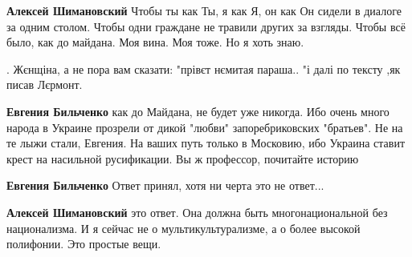 \begin{itemize}
\begin{itemize}
 
\textbf{Алексей Шимановский} Чтобы ты как Ты, я как Я, он как Он сидели в
диалоге за одним столом. Чтобы одни граждане не травили других за взгляды.
Чтобы всё было, как до майдана. Моя вина. Моя тоже. Но я хоть знаю.

 
.
Жєнщіна, а не пора вам сказати: "прівєт нємитая параша.. "і далі по тексту ,як писав Лєрмонт.

 
\textbf{Евгения Бильченко} как до Майдана, не будет уже никогда. Ибо очень
много народа в Украине прозрели от дикой "любви" запоребриковских "братьев". Не
на те лыжи стали, Евгения. На ваших путь только в Московию, ибо Украина ставит
крест на насильной русификации. Вы ж профессор, почитайте историю

 
\textbf{Евгения Бильченко} Ответ принял, хотя ни черта это не ответ...

 
\textbf{Алексей Шимановский} это ответ. Она должна быть многонациональной без
национализма. И я сейчас не о мультикультурализме, а о более высокой полифонии.
Это простые вещи.


\end{itemize}
\end{itemize}

